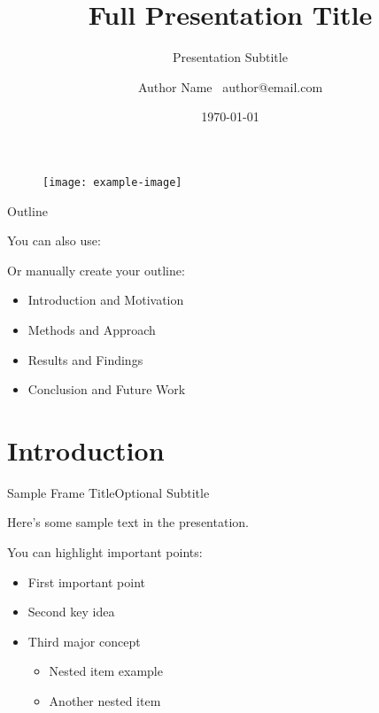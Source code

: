 \documentclass{beamer}
\title[Short Title]{Full Presentation Title}
\subtitle{Presentation Subtitle}
\author[Author Short]{Author Name \ \small author@email.com}
\institute[Inst Short]{
  Institute Name \
  Department Name \
  University/Organization
}
\date{\today}
\begin{document}
\begin{frame}[plain]
    \titlepage
    
    \begin{figure}
        \centering
        \texttt{[image: example-image]} %
    \end{figure}
\end{frame}

\begin{frame}{Outline}
    \tableofcontents[pausesections]  %
    
    You can also use:
    
    Or manually create your outline:
    \begin{itemize}
        \item Introduction and Motivation
        \item Methods and Approach 
        \item Results and Findings 
        \item Conclusion and Future Work 
    \end{itemize} 
\end{frame}


\section{Introduction}

\begin{frame}{Sample Frame Title}{Optional Subtitle} 
    
    Here's some sample text in the presentation.
    
    You can highlight important points:
    
    \begin{itemize}
        \item First important point 
        \item Second key idea 
        \item Third major concept 
            \begin{itemize} 
                \item Nested item example 
                \item Another nested item  
            \end{itemize} 
    \end{itemize} 

\end{frame}
\end{document}
